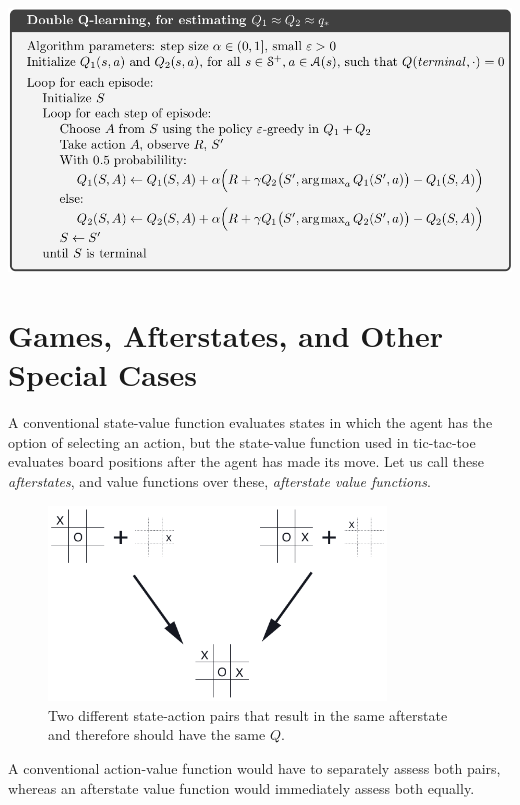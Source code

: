 \begin{center}
    \includegraphics[width=\textwidth]{img/alg_dq_learning.png}
\end{center}

\section{Games, Afterstates, and Other Special Cases}
\label{sec:games_afterstates_and_other_special_cases}
A conventional state-value function evaluates states in which the agent has the option of
selecting an action, but the state-value function used in tic-tac-toe evaluates board positions
after the agent has made its move.
Let us call these \emph{afterstates}\label{t:afterstate}, and value functions over these,
\emph{afterstate value functions}\label{t:afterstate_value_functions}.

\begin{figure}[h]
    \centering
    \includegraphics[width=0.8\textwidth]{img/afterstate_example.png}
    \caption{Two different state-action pairs that result in the same afterstate and therefore
        should have the same $Q$.}
    \label{fig:afterstate_example}
\end{figure}

A conventional action-value function would have to separately assess both pairs, whereas an
afterstate value function would immediately assess both equally.

